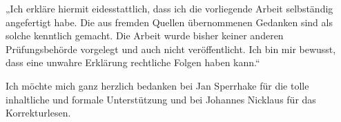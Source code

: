 „Ich  erkläre  hiermit  eidesstattlich,  dass  ich  die  vorliegende  Arbeit selbständig angefertigt habe. Die aus fremden Quellen übernommenen Gedanken sind  als  solche  kenntlich  gemacht.  Die  Arbeit  wurde  bisher  keiner  anderen  Prüfungsbehörde vorgelegt und auch nicht veröffentlicht. Ich bin mir bewusst, dass eine unwahre Erklärung rechtliche Folgen haben kann.“

\vspace{3cm}

Ich möchte mich ganz herzlich bedanken bei Jan Sperrhake für die tolle inhaltliche und formale Unterstützung und bei Johannes Nicklaus für das Korrekturlesen.